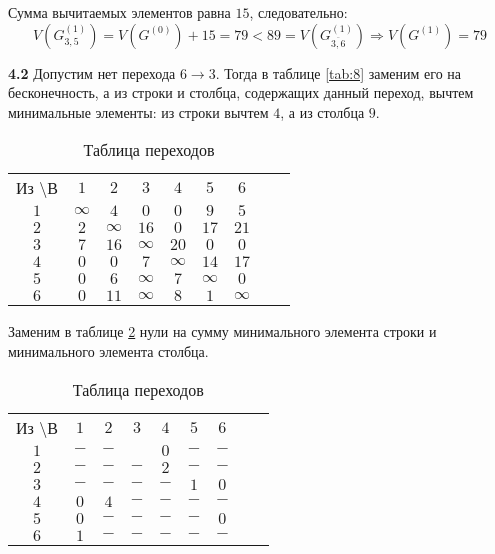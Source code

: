 Сумма вычитаемых элементов равна $15$, следовательно:
\begin{equation*}
V(G_{3,5}^{(1)}) = V(G^{(0)}) + 15 = 79 < 89 = V(G_{\overline{3,6}}^{(1)}) \Rightarrow V(G^{(1)}) = 79
\end{equation*}


\textbf{4.2} Допустим нет перехода $6 \rightarrow 3$. Тогда в таблице \ref{tab:8} заменим его на бесконечность, а из строки и столбца, содержащих данный переход, вычтем минимальные элементы: из строки вычтем $4$, а из столбца $9$.

\begin{table}[H]
\begin{center}
	\def\tabcolsep{15pt}
	\caption{Таблица переходов}
	\label{tab:11}
	\begin{tabular}{|c||c|c|c|c|c|c|c|c|}
		\hline
		Из \textbackslash В & $1$ & $2$ & $3$ & $4$ & $5$ & $6$ \\
		\hhline{|=#=|=|=|=|=|=|}
		$1$ & $\infty$ & $4$ & $0$ & $0$ & $9$ & $5$ \\
		\hline
		$2$ & $2$ & $\infty$ & $16$ & $0$ & $17$ & $21$ \\
		\hline
		$3$ & $7$ & $16$ & $\infty$ & $20$ & $0$ & $0$ \\ 
		\hline
		$4$ & $0$ & $0$ & $7$ & $\infty$ & $14$ & $17$ \\
		\hline
		$5$ & $0$ & $6$ & $\infty$ & $7$ & $\infty$ & $0$ \\
		\hline
		$6$ & $0$ & $11$ & $\infty$ & $8$ & $1$ & $\infty$ \\ 
		\hline
	\end{tabular}
\end{center}
\end{table}

Заменим в таблице \ref{tab:11} нули на сумму минимального элемента строки и минимального элемента столбца.

\begin{table}[H]
\begin{center}
	\def\tabcolsep{15pt}
	\caption{Таблица переходов}
	\label{tab:11}
	\begin{tabular}{|c||c|c|c|c|c|c|c|c|}
		\hline
		Из \textbackslash В & $1$ & $2$ & $3$ & $4$ & $5$ & $6$ \\
		\hhline{|=#=|=|=|=|=|=|}
		$1$ & $-$ & $-$ & \redbold{$7$} & $0$ & $-$ & $-$ \\
		\hline
		$2$ & $-$ & $-$ & $-$ & $2$ & $-$ & $-$ \\
		\hline
		$3$ & $-$ & $-$ & $-$ & $-$ & $1$ & $0$ \\ 
		\hline
		$4$ & $0$ & $4$ & $-$ & $-$ & $-$ & $-$ \\
		\hline
		$5$ & $0$ & $-$ & $-$ & $-$ & $-$ & $0$ \\
		\hline
		$6$ & $1$ & $-$ & $-$ & $-$ & $-$ & $-$ \\ 
		\hline
	\end{tabular}
\end{center}
\end{table}

